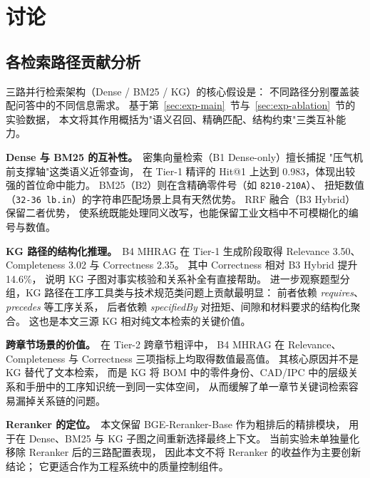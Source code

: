 \section{讨论}
\label{sec:discussion}

\subsection{各检索路径贡献分析}
\label{sec:disc-path}

三路并行检索架构（Dense / BM25 / KG）的核心假设是：
不同路径分别覆盖装配问答中的不同信息需求。
基于第~\ref{sec:exp-main}~节与~\ref{sec:exp-ablation}~节的实验数据，
本文将其作用概括为"语义召回、精确匹配、结构约束"三类互补能力。

\textbf{Dense 与 BM25 的互补性。}~密集向量检索（B1 Dense-only）擅长捕捉
"压气机前支撑轴"这类语义近邻查询，
在 Tier-1 精评的 Hit@1 上达到 0.983，体现出较强的首位命中能力。
BM25（B2）则在含精确零件号（如 \texttt{8210-210A}）、
扭矩数值（\texttt{32-36\,lb.in}）的字符串匹配场景上具有天然优势。
RRF 融合（B3 Hybrid）保留二者优势，
使系统既能处理同义改写，也能保留工业文档中不可模糊化的编号与数值。

\textbf{KG 路径的结构化推理。}~B4 MHRAG 在 Tier-1 生成阶段取得
Relevance 3.50、Completeness 3.02 与 Correctness 2.35。
其中 Correctness 相对 B3 Hybrid 提升 14.6\%，
说明 KG 子图对事实核验和关系补全有直接帮助。
进一步观察题型分组，KG 路径在工序工具类与技术规范类问题上贡献最明显：
前者依赖 \textit{requires}、\textit{precedes} 等工序关系，
后者依赖 \textit{specifiedBy} 对扭矩、间隙和材料要求的结构化聚合。
这也是本文三源 KG 相对纯文本检索的关键价值。

\textbf{跨章节场景的价值。}~在 Tier-2 跨章节粗评中，
B4 MHRAG 在 Relevance、Completeness 与 Correctness 三项指标上均取得数值最高值。
其核心原因并不是 KG 替代了文本检索，
而是 KG 将 BOM 中的零件身份、CAD/IPC 中的层级关系和手册中的工序知识统一到同一实体空间，
从而缓解了单一章节关键词检索容易漏掉关系链的问题。

\textbf{Reranker 的定位。}~本文保留 BGE-Reranker-Base 作为粗排后的精排模块，
用于在 Dense、BM25 与 KG 子图之间重新选择最终上下文。
当前实验未单独量化移除 Reranker 后的三路配置表现，
因此本文不将 Reranker 的收益作为主要创新结论；
它更适合作为工程系统中的质量控制组件。

